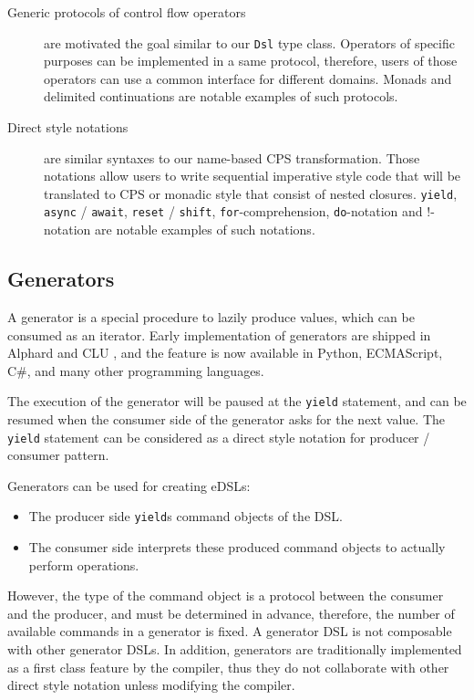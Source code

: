 \begin{description}
  \item[Generic protocols of control flow operators] are motivated the goal similar to our \lstinline{Dsl} type class. Operators of specific purposes can be implemented in a same protocol, therefore, users of those operators can use a common interface for different domains. Monads and delimited continuations are notable examples of such protocols.
  \item[Direct style notations] are similar syntaxes to our name-based CPS transformation. Those notations allow users to write sequential imperative style code that will be translated to CPS or monadic style that consist of nested closures. \lstinline{yield}, \lstinline{async} / \lstinline{await}, \lstinline{reset} / \lstinline{shift}, \lstinline{for}-comprehension, \lstinline{do}-notation and !-notation are notable examples of such notations.
\end{description}

\subsection{Generators}

A generator is a special procedure to lazily produce values, which can be consumed as an iterator. Early implementation of generators are shipped in Alphard \cite{shaw1977abstraction} and CLU \cite{liskov1977abstraction}, and the feature is now available in  Python, ECMAScript, C\#, and many other programming languages.

The execution of the generator will be paused at the \lstinline{yield} statement, and can be resumed when the consumer side of the generator asks for the next value. The \lstinline{yield} statement can be considered as a direct style notation for producer / consumer pattern.

Generators can be used for creating eDSLs:

\begin{itemize}
  \item The producer side \lstinline{yield}s command objects of the DSL.
  \item The consumer side interprets these produced command objects to actually perform operations.
\end{itemize}

However, the type of the command object is a protocol between the consumer and the producer, and must be determined in advance, therefore, the number of available commands in a generator is fixed. A generator DSL is not composable with other generator DSLs. In addition, generators are traditionally implemented as a first class feature by the compiler, thus they do not collaborate with other direct style notation unless modifying the compiler.

